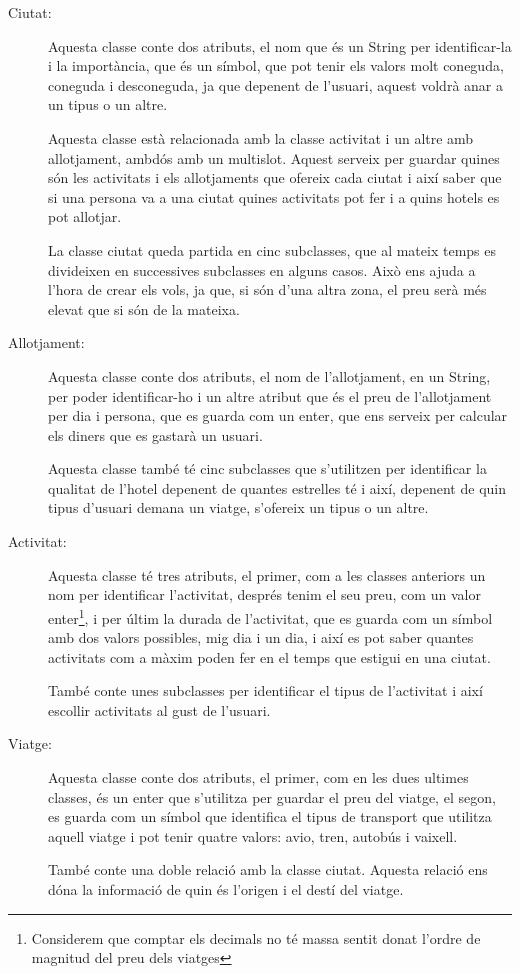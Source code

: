 \documentclass[11pt,a4paper]{article}
\begin{document}
\begin{description}
\item[Ciutat:]Aquesta classe conte dos atributs, el nom que és un String per identificar-la i la importància, que és un símbol, que pot tenir els valors molt coneguda, coneguda i desconeguda, ja que depenent de l'usuari, aquest voldrà anar a un tipus o un altre.

Aquesta classe està relacionada amb la classe activitat i un altre amb allotjament, ambdós amb un multislot. Aquest serveix per guardar quines són les activitats i els allotjaments que ofereix cada ciutat i així saber que si una persona va a una ciutat quines activitats pot fer i a quins hotels es pot allotjar.

La classe ciutat queda partida en cinc subclasses, que al mateix temps es divideixen en successives subclasses en alguns casos. Això ens ajuda a l'hora de crear els vols, ja que, si són d'una altra zona, el preu serà més elevat que si són de la mateixa.

\item[Allotjament:] Aquesta classe conte dos atributs, el nom de l'allotjament, en un String, per poder identificar-ho i un altre atribut que és el preu de l'allotjament per dia i persona, que es guarda com un enter, que ens serveix per calcular els diners que es gastarà un usuari.

Aquesta classe també té cinc subclasses que s'utilitzen per identificar la qualitat de l'hotel depenent de quantes estrelles té i així, depenent de quin tipus d'usuari demana un viatge, s'ofereix un tipus o un altre.

\item[Activitat:] Aquesta classe té tres atributs, el primer, com a les classes anteriors un nom per identificar l'activitat, després tenim el seu preu, com un valor enter\footnote{Considerem que comptar els decimals no té massa sentit donat l'ordre de magnitud del preu dels viatges}, i per últim la durada de l'activitat, que es guarda com un símbol amb dos valors possibles, mig dia i un dia, i així es pot saber quantes activitats com a màxim poden fer en el temps que estigui en una ciutat.

També conte unes subclasses per identificar el tipus de l'activitat i així escollir activitats al gust de l'usuari.

\item[Viatge:] Aquesta classe conte dos atributs, el primer, com en les dues ultimes classes, és un enter que s'utilitza per guardar el preu del viatge, el segon, es guarda com un símbol que identifica el tipus de transport que utilitza aquell viatge i pot tenir quatre valors: avio, tren, autobús i vaixell.

També conte una doble relació amb la classe ciutat. Aquesta relació ens dóna la informació de quin és l'origen i el destí del viatge.
\end{description}
\end{document}
